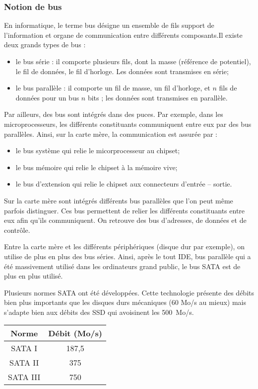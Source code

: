 \subsubsection{Notion de bus}
En informatique, le terme bus désigne un ensemble de fils support de l'information et organe de communication entre différents composants.Il existe deux grands types de bus :
\begin{itemize}
\item le bus série : il comporte plusieurs fils, dont la masse (référence de potentiel), le fil de données, le fil d'horloge. Les données sont transmises en série;
\item le bus parallèle : il comporte un fil de masse, un fil d'horloge, et $n$ fils de données pour un bus $n$ bits ; les données sont transmises en parallèle.  
\end{itemize}

Par ailleurs, des bus sont intégrés dans des puces. Par exemple, dans les microprocesseurs, les différents constituants communiquent entre eux par des bus parallèles. Ainsi, sur la carte mère, la communication est assurée par :
\begin{itemize}
\item le bus système qui relie le micorprocesseur au chipset;
\item le bus mémoire qui relie le chipset à la mémoire vive;
\item le bus d'extension qui relie le chipset aux connecteurs d'entrée -- sortie.
\end{itemize}

	
Sur la carte mère sont intégrés différents bus parallèles que l'on peut même parfois distinguer. Ces bus permettent de relier les différents constituants entre eux afin qu'ils communiquent. On retrouve des bus d'adresses, de données et de contrôle.

Entre la carte mère et les différents périphériques (disque dur par exemple), on utilise de plus en plus des bus séries. Ainsi, après le tout IDE, bus parallèle qui a été massivement utilisé dans les ordinateurs grand public, le bus SATA est de plus en plus utilisé. 
\vspace{.25cm}


\noindent \begin{minipage}[c]{.7\linewidth}
Plusieurs normes SATA ont été développées. 
Cette technologie présente des débits bien plus importants que les disques durs mécaniques  (60 Mo/s au mieux) mais s'adapte bien aux débits des SSD qui avoisinent les \SI{500}{Mo/s}.
\end{minipage} \hfill
\begin{minipage}[c]{.29\linewidth}
\begin{center}
\begin{tabular}{|c|c|}
\hline
Norme & Débit (Mo/s) \\
\hline
SATA I & 187,5 \\ \hline
SATA II & 375 \\ \hline
SATA III & 750 \\ \hline
\end{tabular}
\end{center}
\end{minipage}




